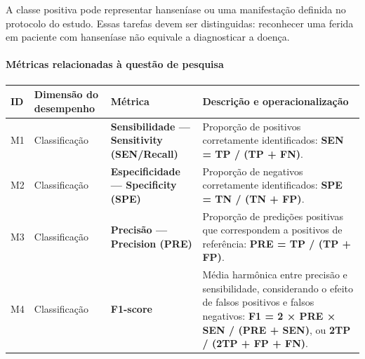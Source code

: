 \documentclass[
]{article}
\newcounter{none} %
\begin{document}
A classe positiva pode representar hanseníase ou uma manifestação
definida no protocolo do estudo. Essas tarefas devem ser distinguidas:
reconhecer uma ferida em paciente com hanseníase não equivale a
diagnosticar a doença.

\paragraph{Métricas relacionadas à questão de
pesquisa}\label{muxe9tricas-relacionadas-uxe0-questuxe3o-de-pesquisa}

{\def\LTcaptype{none} %
\begin{longtable}[]{@{}
  >{\raggedright\arraybackslash}p{}
  >{\raggedright\arraybackslash}p{}
  >{\raggedright\arraybackslash}p{}
  >{\raggedright\arraybackslash}p{}@{}}
\toprule\noalign{}
\begin{minipage}[b]{\linewidth}\raggedright
ID
\end{minipage} & \begin{minipage}[b]{\linewidth}\raggedright
Dimensão do desempenho
\end{minipage} & \begin{minipage}[b]{\linewidth}\raggedright
Métrica
\end{minipage} & \begin{minipage}[b]{\linewidth}\raggedright
Descrição e operacionalização
\end{minipage} \\
\midrule\noalign{}
\endhead
\bottomrule\noalign{}
\endlastfoot
M1 & Classificação & \textbf{Sensibilidade --- Sensitivity (SEN/Recall)}
& Proporção de positivos corretamente identificados: \textbf{SEN = TP /
(TP + FN)}. \\
M2 & Classificação & \textbf{Especificidade --- Specificity (SPE)} &
Proporção de negativos corretamente identificados: \textbf{SPE = TN /
(TN + FP)}. \\
M3 & Classificação & \textbf{Precisão --- Precision (PRE)} & Proporção
de predições positivas que correspondem a positivos de referência:
\textbf{PRE = TP / (TP + FP)}. \\
M4 & Classificação & \textbf{F1-score} & Média harmônica entre precisão
e sensibilidade, considerando o efeito de falsos positivos e falsos
negativos: \textbf{F1 = 2 × PRE × SEN / (PRE + SEN)}, ou \textbf{2TP /
(2TP + FP + FN)}. \\

\end{longtable}}
\end{document}
